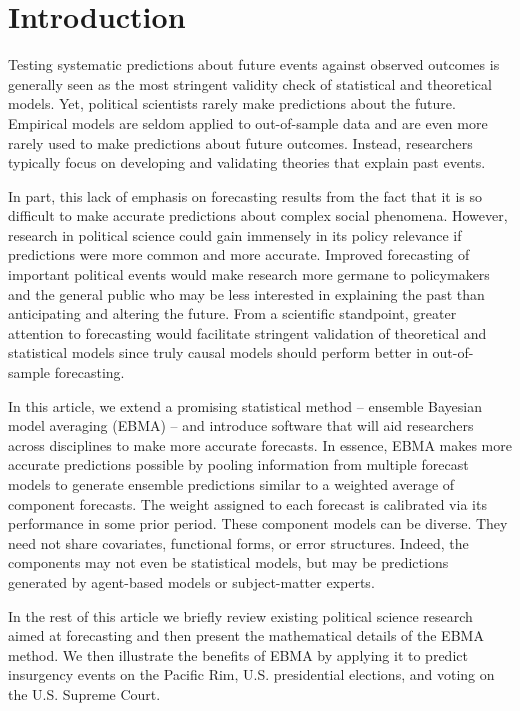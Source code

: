 
\section{Introduction}
Testing systematic predictions about future events against observed
outcomes is generally seen as the most stringent validity check of
statistical and theoretical models.  Yet, political scientists rarely
make predictions about the future.  Empirical models are seldom
applied to out-of-sample data and are even more rarely used to make
predictions about future outcomes. Instead, researchers typically
focus on developing and validating theories that explain past events.

In part, this lack of emphasis on forecasting results from the fact
that it is so difficult to make accurate predictions about complex
social phenomena. However, research in political science could gain
immensely in its policy relevance if predictions were more common and
more accurate.  Improved forecasting of important political events
would make research more germane to policymakers and the general
public who may be less interested in explaining the past than
anticipating and altering the future.  From a scientific standpoint,
greater attention to forecasting would facilitate stringent validation
of theoretical and statistical models since truly causal models should
perform better in out-of-sample forecasting.

In this article, we extend a promising statistical method -- ensemble
Bayesian model averaging (EBMA) -- and introduce software that will
aid researchers across disciplines to make more accurate forecasts.
In essence, EBMA makes more accurate predictions possible by pooling
information from multiple forecast models to generate ensemble
predictions similar to a weighted average of component forecasts. The
weight assigned to each forecast is calibrated via its performance in
some prior period.  These component models can be diverse.  They need
not share covariates, functional forms, or error structures. Indeed,
the components may not even be statistical models, but may be
predictions generated by agent-based models or subject-matter experts.

In the rest of this article we briefly review
existing political science research aimed at forecasting and then
present the mathematical details of the EBMA method. We then
illustrate the benefits of EBMA by applying it to predict insurgency
events on the Pacific Rim, U.S. presidential elections, and voting on
the U.S. Supreme Court.

